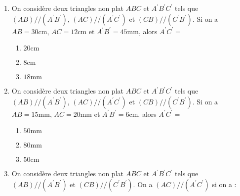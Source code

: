 \documentclass[oneside,twoside]{book}
\begin{document}
\begin{enumerate}
\begin{enumerate}
\end{enumerate}



\item On considère deux triangles non plat $ABC$ et $A^\prime B^\prime C^\prime$ tels que $\left(AB\right)//\left(A^{\prime}B^{\prime}\right)$, $\left(AC\right)//\left(A^{\prime}C^{\prime}\right)$ et $\left(CB\right)//\left(C^{\prime}B^{\prime}\right)$. Si on a $AB=30\mathrm{cm}$, $AC=12\mathrm{cm}$ et $A^{\prime}B^{\prime}=45\mathrm{mm}$, alors $A^{\prime}C^{\prime}=$

\begin{enumerate}


\item\MauvaiseReponse $20\mathrm{cm}$

\item\MauvaiseReponse $8\mathrm{cm}$
\item\BonneReponse $18\mathrm{mm}$

\end{enumerate}




\item On considère deux triangles non plat $ABC$ et $A^\prime B^\prime C^\prime$ tels que $\left(AB\right)//\left(A^{\prime}B^{\prime}\right)$, $\left(AC\right)//\left(A^{\prime}C^{\prime}\right)$ et $\left(CB\right)//\left(C^{\prime}B^{\prime}\right)$. Si on a $AB=15\mathrm{mm}$, $AC=20\mathrm{mm}$ et $A^{\prime}B^{\prime}=6\mathrm{cm}$, alors $A^{\prime}C^{\prime}=$

\begin{enumerate}


\item\MauvaiseReponse $50\mathrm{mm}$

\item\BonneReponse $80\mathrm{mm}$
\item\MauvaiseReponse $50\mathrm{cm}$

\end{enumerate}





\item On considère deux triangles non plat $ABC$ et $A^\prime B^\prime C^\prime$ tels que $\left(AB\right)//\left(A^{\prime}B^{\prime}\right)$ et $\left(CB\right)//\left(C^{\prime}B^{\prime}\right)$. On a $\left(AC\right)//\left(A^{\prime}C^{\prime}\right)$ si on a :

\begin{enumerate}



\end{enumerate}
\end{enumerate}
\end{document}
